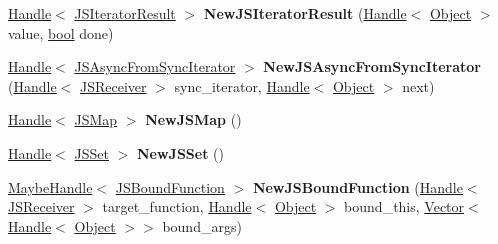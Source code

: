 \begin{DoxyCompactItemize}
\item 
\mbox{\label{classv8_1_1internal_1_1Factory_ad2c926c437c22a09afd1bad00e033433}} 
\mbox{\hyperlink{classv8_1_1internal_1_1Handle}{Handle}}$<$ \mbox{\hyperlink{classv8_1_1internal_1_1JSIteratorResult}{J\+S\+Iterator\+Result}} $>$ {\bfseries New\+J\+S\+Iterator\+Result} (\mbox{\hyperlink{classv8_1_1internal_1_1Handle}{Handle}}$<$ \mbox{\hyperlink{classv8_1_1internal_1_1Object}{Object}} $>$ value, \mbox{\hyperlink{classbool}{bool}} done)
\item 
\mbox{\label{classv8_1_1internal_1_1Factory_a4d7de9a6d3752181617ec157f432390a}} 
\mbox{\hyperlink{classv8_1_1internal_1_1Handle}{Handle}}$<$ \mbox{\hyperlink{classv8_1_1internal_1_1JSAsyncFromSyncIterator}{J\+S\+Async\+From\+Sync\+Iterator}} $>$ {\bfseries New\+J\+S\+Async\+From\+Sync\+Iterator} (\mbox{\hyperlink{classv8_1_1internal_1_1Handle}{Handle}}$<$ \mbox{\hyperlink{classv8_1_1internal_1_1JSReceiver}{J\+S\+Receiver}} $>$ sync\+\_\+iterator, \mbox{\hyperlink{classv8_1_1internal_1_1Handle}{Handle}}$<$ \mbox{\hyperlink{classv8_1_1internal_1_1Object}{Object}} $>$ next)
\item 
\mbox{\label{classv8_1_1internal_1_1Factory_abb357b7bd90eade9a67402d2602a0f2f}} 
\mbox{\hyperlink{classv8_1_1internal_1_1Handle}{Handle}}$<$ \mbox{\hyperlink{classv8_1_1internal_1_1JSMap}{J\+S\+Map}} $>$ {\bfseries New\+J\+S\+Map} ()
\item 
\mbox{\label{classv8_1_1internal_1_1Factory_a54d6c8706afcbb53990a0f89041c7b9c}} 
\mbox{\hyperlink{classv8_1_1internal_1_1Handle}{Handle}}$<$ \mbox{\hyperlink{classv8_1_1internal_1_1JSSet}{J\+S\+Set}} $>$ {\bfseries New\+J\+S\+Set} ()
\item 
\mbox{\label{classv8_1_1internal_1_1Factory_a90c2b9cc28cf11209da9170ed1a072ee}} 
\mbox{\hyperlink{classv8_1_1internal_1_1MaybeHandle}{Maybe\+Handle}}$<$ \mbox{\hyperlink{classv8_1_1internal_1_1JSBoundFunction}{J\+S\+Bound\+Function}} $>$ {\bfseries New\+J\+S\+Bound\+Function} (\mbox{\hyperlink{classv8_1_1internal_1_1Handle}{Handle}}$<$ \mbox{\hyperlink{classv8_1_1internal_1_1JSReceiver}{J\+S\+Receiver}} $>$ target\+\_\+function, \mbox{\hyperlink{classv8_1_1internal_1_1Handle}{Handle}}$<$ \mbox{\hyperlink{classv8_1_1internal_1_1Object}{Object}} $>$ bound\+\_\+this, \mbox{\hyperlink{classv8_1_1internal_1_1Vector}{Vector}}$<$ \mbox{\hyperlink{classv8_1_1internal_1_1Handle}{Handle}}$<$ \mbox{\hyperlink{classv8_1_1internal_1_1Object}{Object}} $>$$>$ bound\+\_\+args)
$$
\end{DoxyCompactItemize}
